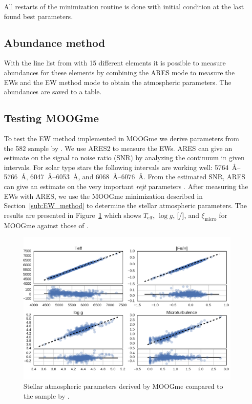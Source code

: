 \documentclass{aa}
\begin{document}
All restarts of the minimization routine is done with initial condition at the
last found best parameters.


\subsection{Abundance method}
\label{sub:Abundance_method}

With the line list from \citet{Neves2009} with 15 different elements it is
possible to measure abundances for these elements by combining the ARES mode to
measure the EWs and the EW method mode to obtain the atmospheric parameters. The
abundances are saved to a table.


\subsection{Testing MOOGme}
\label{sub:Testing_MOOGme}
To test the EW method implemented in MOOGme we derive parameters from the 582
sample by \citet{Sousa2011}. We use ARES2 to measure the EWs. ARES can give an
estimate on the signal to noise ratio (SNR) by analyzing the continuum in given
intervals. For solar type stars the following intervals are working well:
\SIrange{5764}{5766}{\angstrom}, \SIrange{6047}{6053}{\angstrom}, and
\SIrange{6068}{6076}{\angstrom}. From the estimated SNR, ARES can give an
estimate on the very important \emph{rejt} parameters \citep[see][for more
information]{Sousa2015a}. After measuring the EWs with ARES, we use the MOOGme
minimization described in Section~\ref{sub:EW_method} to determine the stellar
atmospheric parameters. The results are presented in Figure~\ref{fig:MOOGmeTest}
which shows $T_\mathrm{eff}$, $\log g$, [/], and
$\xi_\mathrm{micro}$ for MOOGme against those of \citet{Sousa2011}.

\begin{figure}[tpb]
    \centering
    \includegraphics[width=1.0\linewidth]{figures/MOOGmeTest.pdf}
    \caption{Stellar atmospheric parameters derived by MOOGme compared
    to the sample by \citet{Sousa2011}.}
    \label{fig:MOOGmeTest}
\end{figure}
\end{document}
